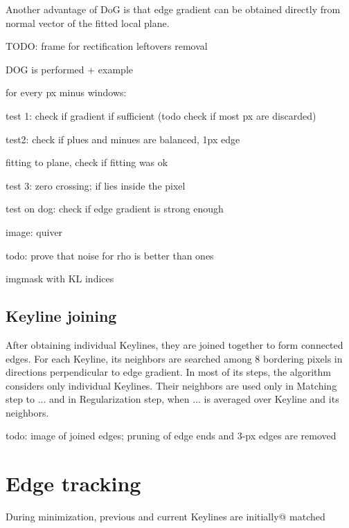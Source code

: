 Another advantage of DoG is that edge gradient can be obtained directly from normal vector of the fitted local plane.

TODO:
frame for rectification leftovers removal

DOG is performed + example

for every px minus windows:

test 1: check if gradient if sufficient (todo check if most px are discarded)

test2: check if plues and minues are balanced, 1px edge

fitting to plane, check if fitting was ok

test 3: zero crossing; if lies inside the pixel

test on dog: check if edge gradient is strong enough

image: quiver

todo: prove that noise for rho is better than ones

imgmask with KL indices

\subsection{Keyline joining}

After obtaining individual Keylines, they are joined together to form connected edges.
For each Keyline, its neighbors are searched among 8 bordering pixels in directions perpendicular to edge gradient.
In most of its steps, the algorithm considers only individual Keylines. Their neighbors are used only in Matching step to ... %
and in Regularization step, when ... %
is averaged over Keyline and its neighbors.

todo: image of joined edges; pruning of edge ends and 3-px edges are removed



\section{Edge tracking}

During minimization, previous and current Keylines are initially@ matched


